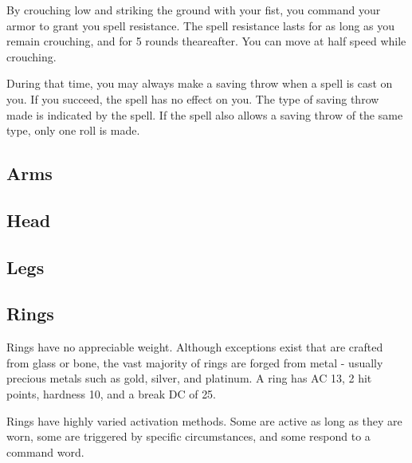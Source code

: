  By crouching low and striking the ground with your fist, you command your armor to grant you spell resistance. The spell resistance lasts for as long as you remain crouching, and for 5 rounds theareafter. You can move at half speed while crouching.

During that time, you may always make a saving throw when a spell is cast on you. If you succeed, the spell has no effect on you. The type of saving throw made is indicated by the spell. If the spell also allows a saving throw of the same type, only one roll is made.


\subsection{Arms}

\subsection{Head}

\subsection{Legs}

\subsection{Rings}

 Rings have no appreciable weight. Although exceptions exist that are crafted from glass or bone, the vast majority of rings are forged from metal - usually precious metals such as gold, silver, and platinum. A ring has AC 13, 2 hit points, hardness 10, and a break DC of 25.

 Rings have highly varied activation methods. Some are active as long as they are worn, some are triggered by specific circumstances, and some respond to a command word.


